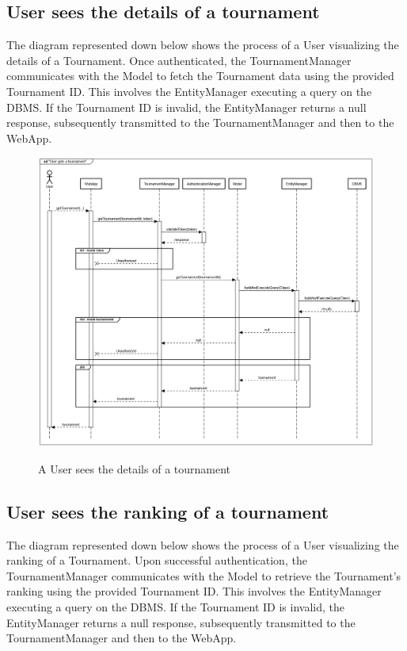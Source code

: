 \documentclass{Configuration_Files/Template}
\begin{document}
\subsection{User sees the details of a tournament}

The diagram represented down below shows the process of a User visualizing the details of a Tournament. Once authenticated, the TournamentManager communicates with the Model to fetch the Tournament data using the provided Tournament ID. This involves the EntityManager executing a query on the DBMS. If the Tournament ID is invalid, the EntityManager returns a null response, subsequently transmitted to the TournamentManager and then to the WebApp.

\begin{figure}[H]
\centering
\includegraphics[scale = 0.33]{Images/diagrams/sequences/GetTournament.png}\\
\caption{A User sees the details of a tournament}
\end{figure}

\subsection{User sees the ranking of a tournament}

The diagram represented down below shows the process of a User visualizing the ranking of a Tournament. Upon successful authentication, the TournamentManager communicates with the Model to retrieve the Tournament's ranking using the provided Tournament ID. This involves the EntityManager executing a query on the DBMS. If the Tournament ID is invalid, the EntityManager returns a null response, subsequently transmitted to the TournamentManager and then to the WebApp.
\end{document}

